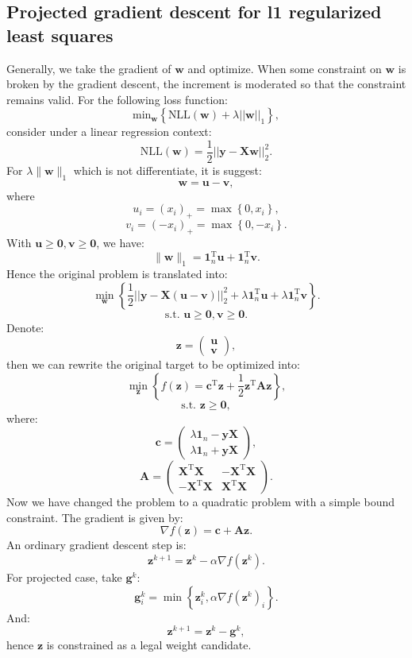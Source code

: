 \documentclass[UTF8]{ctexart}
\begin{document}
\subsection{Projected gradient descent for l1 regularized least squares}
Generally, we take the gradient of $\textbf{w}$ and optimize. 
When some constraint on $\textbf{w}$ is broken by the gradient descent, the increment is moderated so that the constraint remains valid.
For the following loss function:
$$\text{min}_{\textbf{w}}\left\{ \text{NLL}(\textbf{w}) +\lambda||\textbf{w}||_{1}\right\},$$
consider under a linear regression context:
$$\text{NLL}(\textbf{w})=\frac{1}{2}||\textbf{y}-\textbf{X}\textbf{w}||^{2}_{2}.$$
For $\lambda\|\textbf{w}\|_{1}$ which is not differentiate, it is suggest:
$$\textbf{w}=\textbf{u}-\textbf{v},$$
where
$$u_{i}=(x_{i})_{+}=\max \left\{ 0,x_{i} \right\},$$
$$v_{i}=(-x_{i})_{+}=\max \left\{ 0,-x_{i} \right\}.$$
With $\textbf{u} \geq \textbf{0},\textbf{v} \geq \textbf{0}$, we have:
$$\|\textbf{w}\|_{1} = \textbf{1}_{n}^{\text{T}}\textbf{u} + \textbf{1}_{n}^{\text{T}}\textbf{v}.$$
Hence the original problem is translated into:
$$\min_{\textbf{w}}\left\{ \frac{1}{2}||\textbf{y}-\textbf{X}(\textbf{u}-\textbf{v})||^{2}_{2} + \lambda\textbf{1}_{n}^{\text{T}}\textbf{u} + \lambda\textbf{1}_{n}^{\text{T}}\textbf{v} \right\}.$$
$$\text{s.t. }\textbf{u} \geq \textbf{0},\textbf{v} \geq \textbf{0}.$$
Denote:
$$\textbf{z} = \begin{pmatrix}  \textbf{u} \\ \textbf{v} \end{pmatrix},$$
then we can rewrite the original target to be optimized into:
$$\min_{\textbf{z}}\left\{ f(\textbf{z}) = \textbf{c}^{\text{T}}\textbf{z} +\frac{1}{2}\textbf{z}^{\text{T}}\textbf{A}\textbf{z} \right\},$$
$$\text{s.t. }\textbf{z} \geq \textbf{0},$$
where:
$$\textbf{c} = \begin{pmatrix} \lambda \textbf{1}_{n} - \textbf{y}\textbf{X} \\ \lambda\textbf{1}_{n} + \textbf{y}\textbf{X} \end{pmatrix},$$
$$\textbf{A}=\begin{pmatrix} \textbf{X}^{\text{T}}\textbf{X} & -\textbf{X}^{\text{T}}\textbf{X} \\ -\textbf{X}^{\text{T}}\textbf{X} & \textbf{X}^{\text{T}}\textbf{X} \end{pmatrix}.$$
Now we have changed the problem to a quadratic problem with a simple bound constraint. 
The gradient is given by:
$$\nabla f(\textbf{z})=\textbf{c}+\textbf{A}\textbf{z}.$$
An ordinary gradient descent step is:
$$\textbf{z}^{k+1}=\textbf{z}^{k}-\alpha\nabla f(\textbf{z}^{k}).$$
For projected case, take $\textbf{g}^{k}$:
$$\textbf{g}^{k}_{i}=\min\left\{ \textbf{z}^{k}_{i},\alpha\nabla f(\textbf{z}^{k})_{i} \right\}.$$
And:
$$\textbf{z}^{k+1}=\textbf{z}^{k} - \textbf{g}^{k},$$
hence $\textbf{z}$ is constrained as a legal weight candidate.
\end{document}
